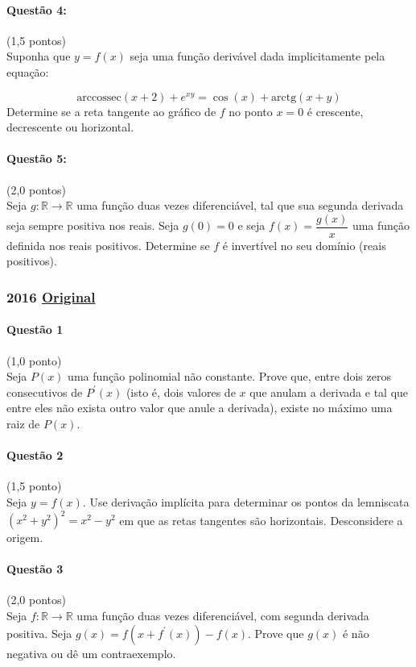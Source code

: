 \documentclass[12pt,a4paper]{article}
\newcommand{\R}{\mathbb{R}}
\newcommand{\original}[1]{\tiny \href{#1}{Original} \normalsize}
\begin{document}
{\paragraph{Questão 4: }(1,5 pontos) \\
Suponha que $y=f(x)$ seja uma função derivável dada implicitamente pela equação:

$$\mathrm{arccossec}(x+2) + e^{xy} = \cos(x) + \mathrm{arctg}(x+y)$$Determine se a reta tangente ao gráfico de $f$ no ponto $x=0$ é crescente, decrescente ou horizontal.

\paragraph{Questão 5: }(2,0 pontos)\\
Seja $g: \R \rightarrow \R$ uma função duas vezes diferenciável, tal que sua segunda derivada seja sempre positiva nos reais. Seja $g(0) = 0$ e seja $f(x) = \dfrac{g(x)}{x}$ uma função definida nos reais positivos.
Determine se $f$ é invertível no seu domínio (reais positivos).
}
\newpage

\subsubsection{2016 \original{https://drive.google.com/open?id=1XmbmqmXBqoPviTSGrnkN7tFxL5eOqz8m}}

\paragraph{Questão 1} (1,0 ponto)\\
Seja $P(x)$ uma função polinomial não constante. Prove que, entre dois zeros consecutivos de $P^{\prime}(x)$ (isto é, dois valores de $x$ que anulam a derivada e tal que entre eles não exista outro valor que anule a derivada), existe no máximo uma raiz de $P(x)$.

\paragraph{Questão 2} (1,5 ponto)\\
Seja $y=f(x)$. Use derivação implícita para determinar os pontos da lemniscata $(x^2+y^2)^2 = x^2-y^2$ em que as retas tangentes são horizontais. Desconsidere a origem.

\paragraph{Questão 3} (2,0 pontos)\\
Seja $f:\R \to \R$ uma função duas vezes diferenciável, com segunda derivada positiva. Seja $g(x) = f(x+f^{\prime}(x))-f(x)$.
Prove que $g(x) $ é não negativa ou dê um contraexemplo.
\end{document}
